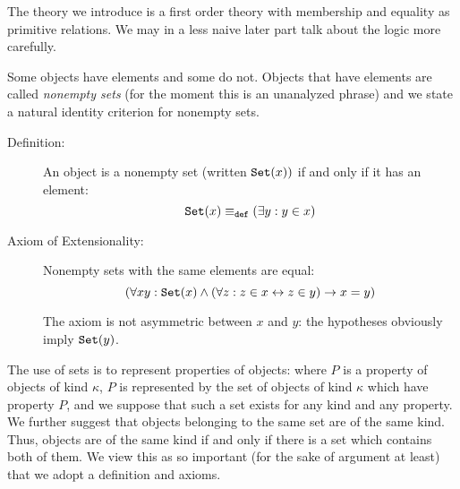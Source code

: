 \documentclass[12pt]{article}
\begin{document}
The theory we introduce is a first order theory with membership and equality as primitive relations.  We may in a less naive later part talk about the logic more carefully.

Some objects have elements and some do not.  Objects that have elements are called {\em nonempty sets\/} (for the moment this is an unanalyzed phrase) and we state a natural identity criterion for nonempty sets.

\begin{description}

\item[Definition:]  An object is a nonempty set (written ${\tt Set}(x))$ if and only if it has an element:  $${\tt Set}(x) \equiv_{\tt def} (\exists y:y \in x)$$

\item[Axiom of Extensionality:]  Nonempty sets with the same elements are equal:  $$(\forall xy:{\tt Set}(x) \wedge(\forall z:z \in x \leftrightarrow z \in y) \rightarrow x=y)$$

The axiom is not asymmetric between $x$ and $y$:  the hypotheses obviously imply ${\tt Set}(y)$.

\end{description}

The use of sets is to represent properties of objects:  where $P$ is a property of objects of kind $\kappa$, $P$ is represented by the set of objects of kind $\kappa$
which have property $P$, and we suppose that such a set exists for any kind and any property.  We further suggest that objects belonging to the same set are of the same kind.  Thus, objects are of the same kind if and only if there is a set which contains both of them.  We view this as so important (for the sake of argument 
at least) that we adopt a definition and axioms.
\end{document}

